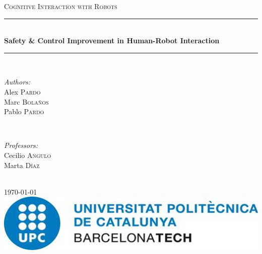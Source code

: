 \documentclass{article}
\begin{document}
\begin{titlepage}

\newcommand{\HRule}{\rule{\linewidth}{0.5mm}} %

\centering

\textsc{\Large Cognitive Interaction with Robots}\\[0.5cm] %


\HRule \\[0.4cm]
{ \huge \bfseries Safety \& Control Improvement in Human-Robot Interaction}\\[0.4cm] %
\HRule \\[1.5cm]

\begin{minipage}{0.5\textwidth}
	\begin{flushleft} \large
		\emph{Authors:}\\
		Alex \textsc{Pardo}\\
		Marc \textsc{Bolaños}\\
		Pablo \textsc{Pardo}\\
	\end{flushleft}
\end{minipage}
~
\begin{minipage}{0.4\textwidth}
	\begin{flushright} \large
		\emph{Professors:} \\
		Cecilio \textsc{Angulo}\\ %
		Marta \textsc{Díaz}
	\end{flushright}
\end{minipage}\\[4cm]


{\large \today}\\[3cm] %

\includegraphics{images/upc_logo.jpg}\\[1cm] %


\vfill %
\end{titlepage}

\tableofcontents
\newpage







\clearpage

{}
\end{document}
